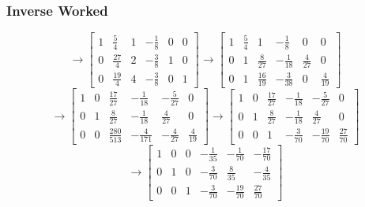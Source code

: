 \documentclass[10pt]{beamer}
\begin{document}
\begin{frame}
  \frametitle{Inverse Worked}
  $$\rightarrow\left[\begin{array}{ccc|ccc}
      1 & \frac{5}{4} & 1 & -\frac{1}{8} & 0 & 0\\
      0 & \frac{27}{4} & 2 & -\frac{3}{8} & 1 & 0\\
      0 & \frac{19}{4} & 4 & -\frac{3}{8} & 0 & 1
    \end{array}\right] \rightarrow \left[\begin{array}{ccc|ccc}
      1 & \frac{5}{4} & 1 & -\frac{1}{8} & 0 & 0\\
      0 & 1 & \frac{8}{27} & -\frac{1}{18} & \frac{4}{27} & 0\\
      0 & 1 & \frac{16}{19} & -\frac{3}{38} & 0 & \frac{4}{19}
    \end{array}\right]$$
  $$\rightarrow\left[\begin{array}{ccc|ccc}
      1 & 0 & \frac{17}{27} & -\frac{1}{18} & -\frac{5}{27} & 0\\
      0 & 1 & \frac{8}{27} & -\frac{1}{18} & \frac{4}{27} & 0\\
      0 & 0 & \frac{280}{513} & -\frac{4}{171} & -\frac{4}{27} & \frac{4}{19}
    \end{array}\right] \rightarrow \left[\begin{array}{ccc|ccc}
      1 & 0 & \frac{17}{27} & -\frac{1}{18} & -\frac{5}{27} & 0\\
      0 & 1 & \frac{8}{27} & -\frac{1}{18} & \frac{4}{27} & 0\\
      0 & 0 & 1 & -\frac{3}{70} & -\frac{19}{70} & \frac{27}{70}
    \end{array}\right]$$
  $$\rightarrow\left[\begin{array}{ccc|ccc}
      1 & 0 & 0 & -\frac{1}{35} & -\frac{1}{70} & -\frac{17}{70}\\
      0 & 1 & 0 & -\frac{3}{70} & \frac{8}{35} & -\frac{4}{35}\\
      0 & 0 & 1 & -\frac{3}{70} & -\frac{19}{70} & \frac{27}{70}
    \end{array}\right]$$
\end{frame}
\end{document}
